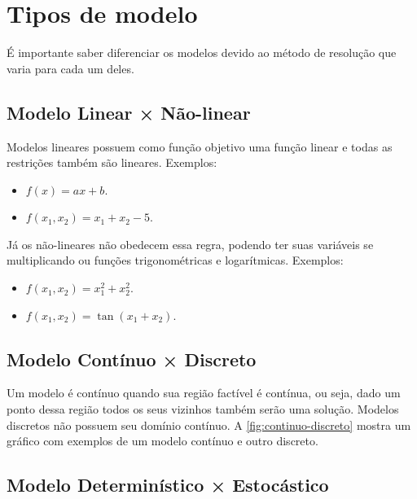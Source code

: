 \section{Tipos de modelo}\label{sec:tipos-de-modelo}

É importante saber diferenciar os modelos devido ao método de resolução que varia para cada um deles.

\subsection{Modelo Linear × Não-linear}\label{subsec:modelo-linear}


Modelos lineares possuem como função objetivo uma função linear e todas as restrições também são lineares.
Exemplos:

\begin{itemize}
    \item $f(x) = ax + b$.
    \item $f(x_1, x_2) = x_1 + x_2 - 5$.
\end{itemize}

Já os não-lineares não obedecem essa regra, podendo ter suas variáveis se multiplicando ou funções trigonométricas e logarítmicas.
Exemplos:

\begin{itemize}
    \item $f(x_1, x_2) = x_1^2 + x_2^2$.
    \item $f(x_1, x_2) = \tan(x_1 + x_2)$.
\end{itemize}



\subsection{Modelo Contínuo × Discreto}\label{subsec:modelo-continuo-x-discreto}

Um modelo é contínuo quando sua região factível é contínua, ou seja, dado um ponto dessa região todos os seus vizinhos também serão uma solução.
Modelos discretos não possuem seu domínio contínuo.
A \autoref{fig:continuo-discreto} mostra um gráfico com exemplos de um modelo contínuo e outro discreto.



\subsection{Modelo Determinístico × Estocástico}\label{subsec:modelo-deterministico-x-estocastico}


